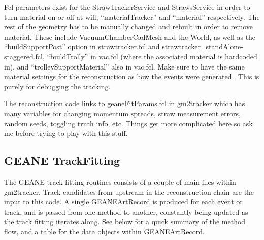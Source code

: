 \documentclass{article}
\begin{document}
    Fcl parameters exist for the StrawTrackerService and StrawsService in order to turn material on or off at will, ``materialTracker'' and ``material'' respectively. The rest of the geometry has to be manually changed and rebuilt in order to remove material. These include VacuumChamberCadMesh and the World, as well as the ``buildSupportPost'' option in strawtracker.fcl and strawtracker\_standAlone-staggered.fcl, ``buildTrolly'' in vac.fcl (where the associated material is hardcoded in), and ``trolleySupportMaterial'' also in vac.fcl. Make sure to have the same material settings for the reconstruction as how the events were generated.. This is purely for debugging the tracking.

    The reconstruction code links to geaneFitParams.fcl in gm2tracker which has many variables for changing momentum spreads, straw measurement errors, random seeds, toggling truth info, etc. Things get more complicated here so ask me before trying to play with this stuff.

  \subsection{GEANE TrackFitting}

    The GEANE track fitting routines consists of a couple of main files within gm2tracker. Track candidates from upstream in the reconstruction chain are the input to this code. A single GEANEArtRecord is produced for each event or track, and is passed from one method to another, constantly being updated as the track fitting iterates along. See below for a quick summary of the method flow, and a table for the data objects within GEANEArtRecord. 
\end{document}
